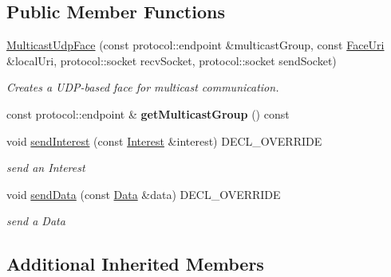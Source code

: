 \subsection*{Public Member Functions}
\begin{DoxyCompactItemize}
\item 
\hyperlink{classnfd_1_1MulticastUdpFace_a35b2236e2bac6af5d94551376f27dcda}{Multicast\+Udp\+Face} (const protocol\+::endpoint \&multicast\+Group, const \hyperlink{classndn_1_1util_1_1FaceUri}{Face\+Uri} \&local\+Uri, protocol\+::socket recv\+Socket, protocol\+::socket send\+Socket)\hypertarget{classnfd_1_1MulticastUdpFace_a35b2236e2bac6af5d94551376f27dcda}{}\label{classnfd_1_1MulticastUdpFace_a35b2236e2bac6af5d94551376f27dcda}

\begin{DoxyCompactList}\small\item\em Creates a U\+D\+P-\/based face for multicast communication. \end{DoxyCompactList}\item 
const protocol\+::endpoint \& {\bfseries get\+Multicast\+Group} () const\hypertarget{classnfd_1_1MulticastUdpFace_ab96635d72e30a573cbc20aecc6a6f589}{}\label{classnfd_1_1MulticastUdpFace_ab96635d72e30a573cbc20aecc6a6f589}

\item 
void \hyperlink{classnfd_1_1MulticastUdpFace_a2186605c595d500b913fb060240f6a94}{send\+Interest} (const \hyperlink{classndn_1_1Interest}{Interest} \&interest) D\+E\+C\+L\+\_\+\+O\+V\+E\+R\+R\+I\+DE\hypertarget{classnfd_1_1MulticastUdpFace_a2186605c595d500b913fb060240f6a94}{}\label{classnfd_1_1MulticastUdpFace_a2186605c595d500b913fb060240f6a94}

\begin{DoxyCompactList}\small\item\em send an Interest \end{DoxyCompactList}\item 
void \hyperlink{classnfd_1_1MulticastUdpFace_a26ba1a0b0ee6ce18fadebbbf9222ff32}{send\+Data} (const \hyperlink{classndn_1_1Data}{Data} \&data) D\+E\+C\+L\+\_\+\+O\+V\+E\+R\+R\+I\+DE
\begin{DoxyCompactList}\small\item\em send a Data \end{DoxyCompactList}\end{DoxyCompactItemize}
\subsection*{Additional Inherited Members}


